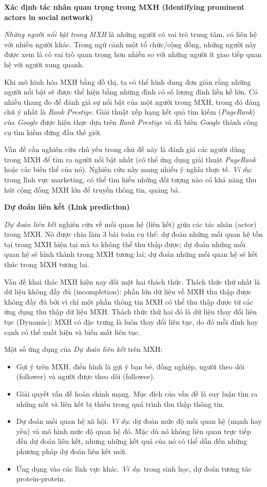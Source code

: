 \documentclass[12pt]{extarticle}
\begin{document}
			\par \textbf{Xác định tác nhân quan trọng trong MXH (Identifying prominent actors in social network)}
			\par \textit{Những người nổi bật trong MXH} là những người có vai trò trung tâm, có liên hệ với nhiều người khác. Trong ngữ cảnh một tổ chức/cộng đồng, những người này được xem là có vai trò quan trọng hơn nhiều so với những người ít giao tiếp quan hệ với người xung quanh.
			\par Khi mô hình hóa MXH bằng đồ thị, ta có thể hình dung đơn giản rằng những người nổi bật sẽ được thể hiện bằng những đỉnh có số lượng đỉnh liền kề lớn. Có nhiều thang đo để đánh giá sự nổi bật của một người trong MXH, trong đó đáng chú ý nhất là \textit{Rank Prestige}. Giải thuật xếp hạng kết quả tìm kiếm (\textit{PageRank}) của \textit{Google} được hiện thực dựa trên \textit{Rank Prestige} và đã biến \textit{Google} thành công cụ tìm kiếm đứng đầu thế giới.
			\par Vấn đề cần nghiên cứu chủ yếu trong chủ đề này là đánh giá các người dùng trong MXH để tìm ra người nổi bật nhất (có thể ứng dụng giải thuật \textit{PageRank} hoặc các biến thể của nó). Nghiên cứu này mang nhiều ý nghĩa thực tế. \textit{Ví dụ}: trong lĩnh vực marketing, có thể tìm hiểu những đối tượng nào có khả năng thu hút cộng đồng MXH lớn để truyền thông tin, quảng bá.
			\par \textbf{Dự đoán liên kết (Link prediction)}
			\par \textit{Dự đoán liên kết} nghiên cứu về mối quan hệ (liên kết) giữa các tác nhân (actor) trong MXH. Nó được chia làm 3 bài toán cụ thể: dự đoán những mối quan hệ tồn tại trong MXH hiện tại mà ta không thể thu thập được; dự đoán những mối quan hệ sẽ hình thành trong MXH tương lai; dự đoán những mối quan hệ sẽ kết thúc trong MXH tương lai.
			\par Vấn đề khai thác MXH hiện nay đối mặt hai thách thức. Thách thức thứ nhất là dữ liệu không đầy đủ (incompletion): phần lớn dữ liệu về MXH thu thập được không đầy đủ bởi vì chỉ một phần thông tin MXH có thể thu thập được từ các ứng dụng thu thập dữ liệu MXH. Thách thức thứ hai đó là dữ liệu thay đổi liên tục (Dynamic): MXH có đặc trưng là luôn thay đổi liên tục, do đó mỗi đỉnh hay cạnh có thể xuất hiện và biến mất liên tục.
			\par Một số ứng dụng của \textit{Dự đoán liên kết} trên MXH:
			\begin{itemize}
				\item Gợi ý trên MXH, điển hình là gợi ý bạn bè, đồng nghiệp, người theo dõi (follower) và người được theo dõi (followee).
				\item Giải quyết vấn đề hoàn chỉnh mạng. Mục đích của vấn đề là suy luận tìm ra những nốt và liên kết bị thiếu trong quá trình thu thập thông tin.
				\item Dự đoán mối quan hệ xã hội. \textit{Ví dụ}: dự đoán mức độ mối quan hệ (mạnh hay yếu) và mô hình mức độ quan hệ đó. Mặc dù nó không liên quan trực tiếp đến dự đoán liên kết, nhưng những kết quả của nó có thể dẫn đến những phương pháp dự đoán liên kết mới.
				\item Ứng dụng vào các lĩnh vực khác. \textit{Ví dụ}: trong sinh học, dự đoán tương tác protein-protein. 
			\end{itemize}
\end{document}
